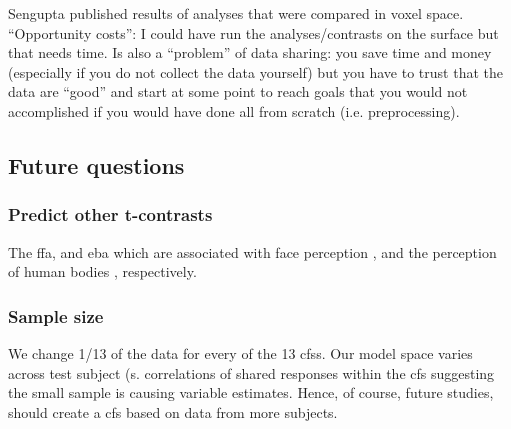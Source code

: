 

%
Sengupta published results of analyses that were compared in voxel space.
%
``Opportunity costs'': I could have run the analyses/contrasts on the surface
but that needs time.
%
Is also a ``problem'' of data sharing: you save time and money (especially if
you do not collect the data yourself) but you have to trust that the data are
``good'' and start at some point to reach goals that you would not accomplished
if you would have done all from scratch (i.e. preprocessing).


\subsection{Future questions}


\subsubsection{Predict other t-contrasts}


%
The \ac{ffa}, and \ac{eba}  which are associated with face perception
\citep{kanwisher1997ffa, pitcher2011occipitalfacearea}, and the perception of
human bodies \citep{downing2001bodyarea}, respectively.


\subsubsection{Sample size}




%
We change 1/13 of the data for every of the 13 \acp{cfs}.
%
Our model space varies across test subject (s. correlations of shared responses
within the \ac{cfs} suggesting the small sample is causing variable estimates.
%
Hence, of course, future studies, should create a \ac{cfs} based on data from
more subjects.

